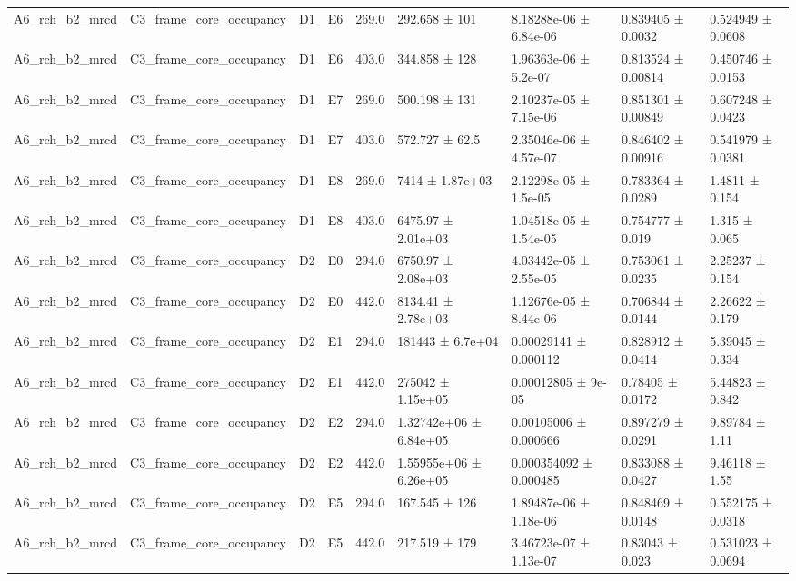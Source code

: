 \begin{table}
\begin{tabular}{lllllllll}
A6\_rch\_b2\_mrcd & C3\_frame\_core\_occupancy & D1 & E6 & 269.0 & 292.658 ± 101 & 8.18288e-06 ± 6.84e-06 & 0.839405 ± 0.0032 & 0.524949 ± 0.0608 \\
A6\_rch\_b2\_mrcd & C3\_frame\_core\_occupancy & D1 & E6 & 403.0 & 344.858 ± 128 & 1.96363e-06 ± 5.2e-07 & 0.813524 ± 0.00814 & 0.450746 ± 0.0153 \\
A6\_rch\_b2\_mrcd & C3\_frame\_core\_occupancy & D1 & E7 & 269.0 & 500.198 ± 131 & 2.10237e-05 ± 7.15e-06 & 0.851301 ± 0.00849 & 0.607248 ± 0.0423 \\
A6\_rch\_b2\_mrcd & C3\_frame\_core\_occupancy & D1 & E7 & 403.0 & 572.727 ± 62.5 & 2.35046e-06 ± 4.57e-07 & 0.846402 ± 0.00916 & 0.541979 ± 0.0381 \\
A6\_rch\_b2\_mrcd & C3\_frame\_core\_occupancy & D1 & E8 & 269.0 & 7414 ± 1.87e+03 & 2.12298e-05 ± 1.5e-05 & 0.783364 ± 0.0289 & 1.4811 ± 0.154 \\
A6\_rch\_b2\_mrcd & C3\_frame\_core\_occupancy & D1 & E8 & 403.0 & 6475.97 ± 2.01e+03 & 1.04518e-05 ± 1.54e-05 & 0.754777 ± 0.019 & 1.315 ± 0.065 \\
A6\_rch\_b2\_mrcd & C3\_frame\_core\_occupancy & D2 & E0 & 294.0 & 6750.97 ± 2.08e+03 & 4.03442e-05 ± 2.55e-05 & 0.753061 ± 0.0235 & 2.25237 ± 0.154 \\
A6\_rch\_b2\_mrcd & C3\_frame\_core\_occupancy & D2 & E0 & 442.0 & 8134.41 ± 2.78e+03 & 1.12676e-05 ± 8.44e-06 & 0.706844 ± 0.0144 & 2.26622 ± 0.179 \\
A6\_rch\_b2\_mrcd & C3\_frame\_core\_occupancy & D2 & E1 & 294.0 & 181443 ± 6.7e+04 & 0.00029141 ± 0.000112 & 0.828912 ± 0.0414 & 5.39045 ± 0.334 \\
A6\_rch\_b2\_mrcd & C3\_frame\_core\_occupancy & D2 & E1 & 442.0 & 275042 ± 1.15e+05 & 0.00012805 ± 9e-05 & 0.78405 ± 0.0172 & 5.44823 ± 0.842 \\
A6\_rch\_b2\_mrcd & C3\_frame\_core\_occupancy & D2 & E2 & 294.0 & 1.32742e+06 ± 6.84e+05 & 0.00105006 ± 0.000666 & 0.897279 ± 0.0291 & 9.89784 ± 1.11 \\
A6\_rch\_b2\_mrcd & C3\_frame\_core\_occupancy & D2 & E2 & 442.0 & 1.55955e+06 ± 6.26e+05 & 0.000354092 ± 0.000485 & 0.833088 ± 0.0427 & 9.46118 ± 1.55 \\
A6\_rch\_b2\_mrcd & C3\_frame\_core\_occupancy & D2 & E5 & 294.0 & 167.545 ± 126 & 1.89487e-06 ± 1.18e-06 & 0.848469 ± 0.0148 & 0.552175 ± 0.0318 \\
A6\_rch\_b2\_mrcd & C3\_frame\_core\_occupancy & D2 & E5 & 442.0 & 217.519 ± 179 & 3.46723e-07 ± 1.13e-07 & 0.83043 ± 0.023 & 0.531023 ± 0.0694 \\

\end{tabular}
\end{table}
